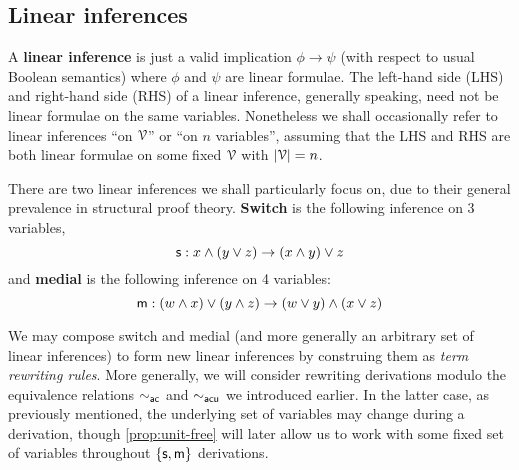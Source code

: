 \documentclass[a4paper, UKenglish, cleveref]{lipics-v2019}
\begin{document}
\subsection{Linear inferences}
A \textbf{linear inference}
is just a valid implication $\phi \to \psi$ (with respect to usual Boolean semantics) where $\phi$ and $\psi$ are linear formulae.
The left-hand side (LHS) and right-hand side (RHS) of a linear inference, generally speaking, need not be linear formulae on the same variables.
Nonetheless we shall occasionally refer to linear inferences ``on $\mathcal{V}$'' or ``on \(n\) variables'', assuming that the LHS and RHS are both linear formulae on some fixed \(\mathcal{V}\) with \(|\mathcal{V}| = n\).


There are two linear inferences we shall particularly focus on, due to their general prevalence in structural proof theory. \textbf{Switch} is the following inference on 3 variables,
\begin{equation}\label{eq:switch}
\mathsf{s} : x \land (y \lor z) \to (x \land y) \lor z
\end{equation}
and \textbf{medial} is the following inference on 4 variables:
\begin{equation}\label{eq:medial}
\mathsf{m} : (w \land x) \lor (y \land z) \to (w \lor y) \land (x \lor z)
\end{equation}

We may compose switch and medial (and more generally an arbitrary set of linear inferences) to form new linear inferences by construing them as \emph{term rewriting rules}.
More generally, we will consider rewriting derivations modulo the equivalence relations $\sim_{\mathsf{ac}}$ and $\sim_{\mathsf{acu}}$ we introduced earlier.
In the latter case, as previously mentioned, the underlying set of variables may change during a derivation, though \cref{prop:unit-free} will later allow us to work with some fixed set of variables throughout $\{\mathsf{s}, \mathsf{m}\}$ derivations.
\end{document}
